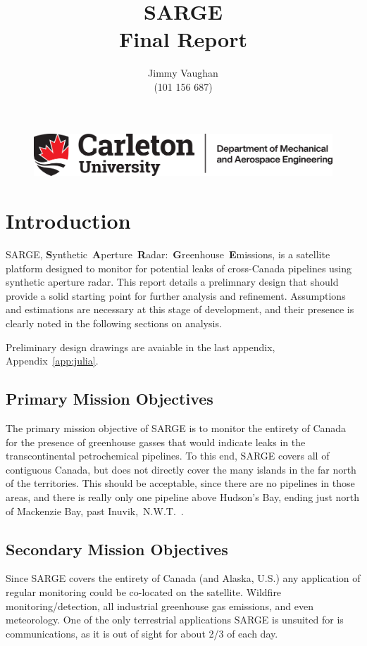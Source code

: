 \documentclass[9pt]{article}
\title{\Huge SARGE\\\Large Final Report}
\author{Jimmy Vaughan\\(101 156 687)}
\begin{document}
\begin{figure}[t]
  \centering
  \includegraphics[width=.7\linewidth]{CarletonLogo}
\end{figure}
\maketitle
{}
\clearpage
\tableofcontents
\clearpage
{}
\section{Introduction}
SARGE, \textbf{S}ynthetic~\textbf{A}perture~\textbf{R}adar:~\textbf{G}reenhouse~\textbf{E}missions, is a satellite platform designed to monitor for potential leaks of cross-Canada pipelines using synthetic aperture radar.
This report details a prelimnary design that should provide a solid starting point for further analysis and refinement.
Assumptions and estimations are necessary at this stage of development, and their presence is clearly noted in the following sections on analysis.

Preliminary design drawings are avaiable in the last appendix, Appendix~\ref{app:julia}.

\subsection{Primary Mission Objectives}
  The primary mission objective of SARGE is to monitor the entirety of Canada for the presence of greenhouse gasses that would indicate leaks in the transcontinental petrochemical pipelines.
  To this end, SARGE covers all of contiguous Canada, but does not directly cover the many islands in the far north of the territories.
  This should be acceptable, since there are no pipelines in those areas, and there is really only one pipeline above Hudson's Bay, ending just north of Mackenzie Bay, past Inuvik,~N.W.T.~\cite{pipelines}.
\subsection{Secondary Mission Objectives}
  Since SARGE covers the entirety of Canada (and Alaska, U.S.) any application of regular monitoring could be co-located on the satellite.
  Wildfire monitoring/detection, all industrial greenhouse gas emissions, and even meteorology.
  One of the only terrestrial applications SARGE is unsuited for is communications, as it is out of sight for about 2/3 of each day.
\end{document}
